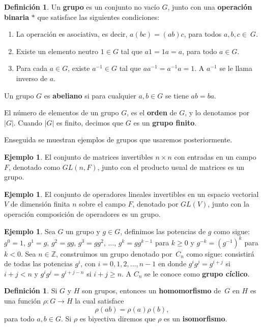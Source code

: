 \documentclass[12pt]{book}
\theoremstyle{definition}
\newtheorem{definition}[theorem]{Definición}
\newtheorem{example}[theorem]{Ejemplo}
\newcounter{in}
\newcounter{ini}
\begin{document}
\begin{definition} 
  Un \textbf{grupo} es un conjunto no vacío $G$, junto con una
  \textbf{operación binaria} $*$ que satisface las siguientes condiciones:
    \begin{enumerate}
    \item La operación es asociativa, es decir, $a(bc)=(ab)c$, para
      todos $a,b,c\in~G$.
    \item Existe un elemento neutro $1 \in G$ tal que $a1=1a=a$, para
      todo $a \in G$.
    \item Para cada $a \in G$, existe $a^{-1} \in G$ tal que
      $aa^{-1}=a^{-1}a=1$. A $a^{-1}$ se le llama inverso de $a$.
    \end{enumerate}
Un grupo $G$ es \textbf{abeliano} si para cualquier $a,b\in G$ se tiene $ab=ba$.
\end{definition}
El número de elementos de un grupo $G$, es el \textbf{orden} de $G$, y
lo denotamos por $|G|$. Cuando $|G|$ es finito, decimos que $G$ es un
\textbf{grupo finito}.

Enseguida se muestran ejemplos de grupos que usaremos posteriormente.
\begin{example}
  \label{GL(nF)}
  El conjunto de matrices invertibles $n \times n$ con
  entradas en un campo $F$, denotado como $GL(n,F)$, junto con el
  producto usual de matrices es un grupo.  
\end{example}

\begin{example}
  \label{GL(V)}
  El conjunto de operadores lineales invertibles en un espacio vectorial $V$ de dimensión finita
  $n$ sobre el campo $F$, denotado por $GL(V)$, junto con la
  operación composición de operadores es un grupo.
\end{example}

\begin{example}
  \label{grupo-ciclico}
  Sea $G$ un grupo y $g\in G$, definimos las potencias de $g$ como
  sigue: $g^{0}=1$, $g^{1}=g$, $g^{2}=gg$,
  $g^{3}=gg^{2}$, $\dots$, $g^{k}=gg^{k-1}$ para $k\geq0$ y
  $g^{-k}=(g^{-1})^{k}$ para $k<0$.
  Sea $n\in \mathbb{Z}$, construimos un grupo denotado por~$C_{n}$ como sigue: consistirá
  de todas las potencias $g^{i}$, con $i=0,1,2,\dots,n-1$ en donde $g^{i}g^{j}=g^{i+j}$ si $i+j< n$ y
  $g^{i}g^{j}=g^{i+j-n}$ si $i+j\geq n$. A $C_{n}$ se le conoce como \textbf{grupo
    cíclico}.
\end{example}

\begin{definition}
  Si $G$ y $H$ son grupos, entonces un \textbf{homomorfismo} de~$G$
  en $H$ es una función $\rho:G\rightarrow H$ la cual
  satisface $$\rho(ab)=\rho(a)\rho(b),$$
  para todo $a,b \in G$. Si $\rho$ es biyectiva diremos que $\rho$ es
  un \textbf{isomorfismo}.
\end{definition}
\end{document}
